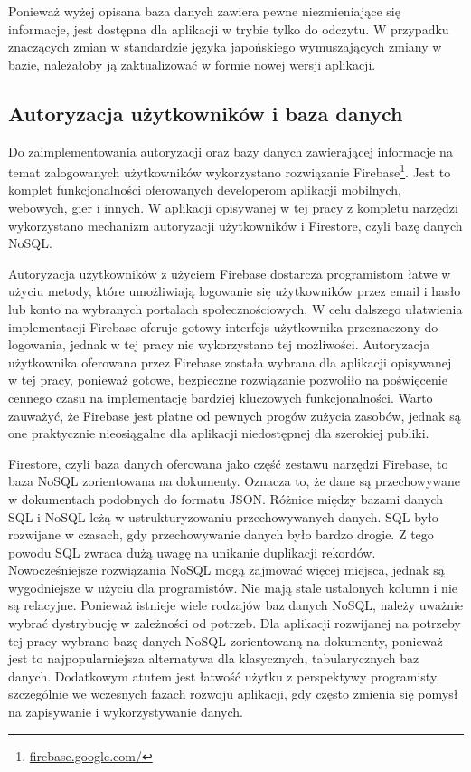 \documentclass[a4paper,twoside,12pt]{book}
\begin{document}
Ponieważ wyżej opisana baza danych zawiera pewne niezmieniające się informacje, jest dostępna dla aplikacji w trybie tylko do odczytu. W przypadku znaczących zmian w standardzie języka japońskiego wymuszających zmiany w bazie, należałoby ją zaktualizować w formie nowej wersji aplikacji.

\subsection{Autoryzacja użytkowników i baza danych}
Do zaimplementowania autoryzacji oraz bazy danych zawierającej informacje na temat zalogowanych użytkowników wykorzystano rozwiązanie Firebase\footnote{\url{firebase.google.com/}}. Jest to komplet funkcjonalności oferowanych developerom aplikacji mobilnych, webowych, gier i innych. W aplikacji opisywanej w tej pracy z kompletu narzędzi wykorzystano mechanizm autoryzacji użytkowników i Firestore, czyli bazę danych NoSQL. 

Autoryzacja użytkowników z użyciem Firebase dostarcza programistom łatwe w użyciu metody, które umożliwiają logowanie się użytkowników przez email i hasło lub konto na wybranych portalach społecznościowych. W celu dalszego ułatwienia implementacji Firebase oferuje gotowy interfejs użytkownika przeznaczony do logowania, jednak w tej pracy nie wykorzystano tej możliwości. Autoryzacja użytkownika oferowana przez Firebase została wybrana dla aplikacji opisywanej w tej pracy, ponieważ gotowe, bezpieczne rozwiązanie pozwoliło na poświęcenie cennego czasu na implementację bardziej kluczowych funkcjonalności. Warto zauważyć, że Firebase jest płatne od pewnych progów zużycia zasobów, jednak są one praktycznie nieosiągalne dla aplikacji niedostępnej dla szerokiej publiki.

Firestore, czyli baza danych oferowana jako część zestawu narzędzi Firebase, to baza NoSQL zorientowana na dokumenty. Oznacza to, że dane są przechowywane w dokumentach podobnych do formatu JSON. Różnice między bazami danych SQL i NoSQL leżą w ustrukturyzowaniu przechowywanych danych. SQL było rozwijane w czasach, gdy przechowywanie danych było bardzo drogie. Z tego powodu SQL zwraca dużą uwagę na unikanie duplikacji rekordów. Nowocześniejsze rozwiązania NoSQL mogą zajmować więcej miejsca, jednak są wygodniejsze w użyciu dla programistów. Nie mają stale ustalonych kolumn i nie są relacyjne. Ponieważ istnieje wiele rodzajów baz danych NoSQL, należy uważnie wybrać dystrybucję w zależności od potrzeb. Dla aplikacji rozwijanej na potrzeby tej pracy wybrano bazę danych NoSQL zorientowaną na dokumenty, ponieważ jest to najpopularniejsza alternatywa dla klasycznych, tabularycznych baz danych. Dodatkowym atutem jest łatwość użytku z perspektywy programisty, szczególnie we wczesnych fazach rozwoju aplikacji, gdy często zmienia się pomysł na zapisywanie i wykorzystywanie danych. 
\end{document}
